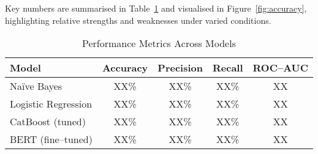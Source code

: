 Key numbers are summarised in Table~\ref{tab:results} and visualised in
Figure~\ref{fig:accuracy}, highlighting relative strengths and
weaknesses under varied conditions.

\begin{table}[tb]  %
\caption{Performance Metrics Across Models}%
\label{tab:results}
\centering
\begin{tabular}{|l|c|c|c|c|}
\hline
\textbf{Model} & \textbf{Accuracy} & \textbf{Precision} &
\textbf{Recall} & \textbf{ROC--AUC} \\
\hline
Naïve Bayes            & XX\% & XX\% & XX\% & XX \\ %
Logistic Regression    & XX\% & XX\% & XX\% & XX \\
CatBoost (tuned)       & XX\% & XX\% & XX\% & XX \\
BERT (fine–tuned)      & XX\% & XX\% & XX\% & XX \\
\hline
\end{tabular}
\end{table}

